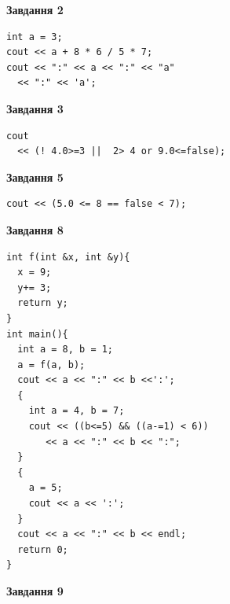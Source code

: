 \documentclass[12pt, ukrainian]{article}
\begin{document}
{\begin {large}
\begin{minipage}[t]{7.0cm}
\end{minipage}
\vline \hspace{1mm}
\begin{minipage}[t]{11.0cm}

\begin{center}
\textbf{Завдання 2}
\end{center}
\vspace{-8mm}

\begin{verbatim}
int a = 3;
cout << a + 8 * 6 / 5 * 7;
cout << ":" << a << ":" << "a" 
  << ":" << 'a';
\end{verbatim}



\begin{center}
\textbf{Завдання 3}
\end{center}
\vspace{-8mm}

\begin{verbatim}
cout 
  << (! 4.0>=3 ||  2> 4 or 9.0<=false);
\end{verbatim}



\begin{center}
\textbf{Завдання 5}
\end{center}
\vspace{-8mm}

\begin{verbatim}
cout << (5.0 <= 8 == false < 7);
\end{verbatim}



\begin{center}
\textbf{Завдання 8}
\end{center}
\vspace{-8mm}

\begin{verbatim}
int f(int &x, int &y){
  x = 9;
  y+= 3;
  return y;
}
int main(){
  int a = 8, b = 1;
  a = f(a, b);
  cout << a << ":" << b <<':';
  {
    int a = 4, b = 7;
    cout << ((b<=5) && ((a-=1) < 6))
       << a << ":" << b << ":";
  }
  {
    a = 5;
    cout << a << ':';
  }
  cout << a << ":" << b << endl;
  return 0;
}
\end{verbatim}

\end{minipage}


\begin{minipage}[t]{7.0cm}

\begin{center}
\textbf{Завдання 9}
\end{center}
\vspace{-8mm}


\end{minipage}
\end{large}}
\end{document}
